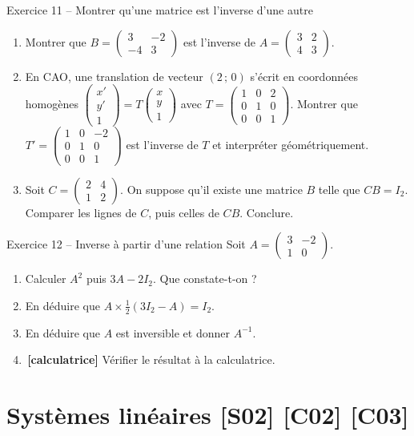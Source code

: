 \documentclass[a4paper,11pt]{article}
\newcommand{\M}[1]{\begin{pmatrix}#1\end{pmatrix}}
\newcommand{\calc}{\,{\color{uimmred}\small\textbf{[calculatrice]}}}
\begin{document}
\begin{exo}{Exercice 11 -- Montrer qu'une matrice est l'inverse d'une autre}
\label{exo:11}
\begin{enumerate}[label=\alph*)]
  \item Montrer que $B = \M{3 & -2\\ -4 & 3}$ est l'inverse de $A = \M{3 & 2\\ 4 & 3}$.
  \item En CAO, une translation de vecteur $(2\,;\,0)$ s'écrit en coordonnées homogènes $\M{x'\\y'\\1} = T\M{x\\y\\1}$ avec $T = \M{1 & 0 & 2\\ 0 & 1 & 0\\ 0 & 0 & 1}$. Montrer que $T' = \M{1 & 0 & -2\\ 0 & 1 & 0\\ 0 & 0 & 1}$ est l'inverse de $T$ et interpréter géométriquement.
  \item Soit $C = \M{2 & 4\\ 1 & 2}$. On suppose qu'il existe une matrice $B$ telle que $CB = I_2$. Comparer les lignes de $C$, puis celles de $CB$. Conclure.
\end{enumerate}
\end{exo}

\begin{exo}{Exercice 12 -- Inverse à partir d'une relation}
\label{exo:12}
Soit $A = \M{3 & -2\\ 1 & 0}$.
\begin{enumerate}[label=\alph*)]
  \item Calculer $A^2$ puis $3A - 2I_2$. Que constate-t-on ?
  \item En déduire que $A\times\frac{1}{2}(3I_2 - A) = I_2$.
  \item En déduire que $A$ est inversible et donner $A^{-1}$.
  \item \calc{} Vérifier le résultat à la calculatrice.
\end{enumerate}
\end{exo}

\needspace{7cm}
\section{Systèmes linéaires \hfill {\normalsize\color{uimmred}[S02] [C02] [C03]}}
\end{document}
